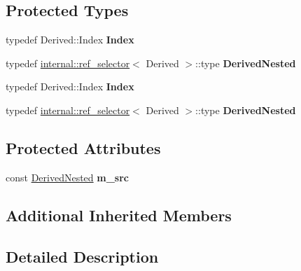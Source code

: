 \subsection*{Protected Types}
\begin{DoxyCompactItemize}
\item 
\mbox{\label{class_eigen_1_1_matrix_square_root_return_value_a65101d272a387965adb3d95a92538022}} 
typedef Derived\+::\+Index {\bfseries Index}
\item 
\mbox{\label{class_eigen_1_1_matrix_square_root_return_value_a369dd2f148fb8cfbbc512cdf6df7c51c}} 
typedef \hyperlink{struct_eigen_1_1internal_1_1ref__selector}{internal\+::ref\+\_\+selector}$<$ Derived $>$\+::type {\bfseries Derived\+Nested}
\item 
\mbox{\label{class_eigen_1_1_matrix_square_root_return_value_a65101d272a387965adb3d95a92538022}} 
typedef Derived\+::\+Index {\bfseries Index}
\item 
\mbox{\label{class_eigen_1_1_matrix_square_root_return_value_a369dd2f148fb8cfbbc512cdf6df7c51c}} 
typedef \hyperlink{struct_eigen_1_1internal_1_1ref__selector}{internal\+::ref\+\_\+selector}$<$ Derived $>$\+::type {\bfseries Derived\+Nested}
\end{DoxyCompactItemize}
\subsection*{Protected Attributes}
\begin{DoxyCompactItemize}
\item 
\mbox{\label{class_eigen_1_1_matrix_square_root_return_value_a8626f5a18340e646c08ec13cb04b2d62}} 
const \hyperlink{class_eigen_1_1internal_1_1_tensor_lazy_evaluator_writable}{Derived\+Nested} {\bfseries m\+\_\+src}
\end{DoxyCompactItemize}
\subsection*{Additional Inherited Members}


\subsection{Detailed Description}

